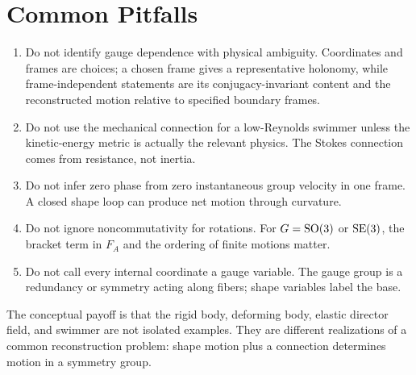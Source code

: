 \section{Common Pitfalls}
\label{sec:gauge-common-pitfalls}

\begin{enumerate}
\item Do not identify gauge dependence with physical ambiguity.  Coordinates
and frames are choices; a chosen frame gives a representative holonomy, while
frame-independent statements are its conjugacy-invariant content and the
reconstructed motion relative to specified boundary frames.
\item Do not use the mechanical connection for a low-Reynolds swimmer unless
the kinetic-energy metric is actually the relevant physics.  The Stokes
connection comes from resistance, not inertia.
\item Do not infer zero phase from zero instantaneous group velocity in one
frame.  A closed shape loop can produce net motion through curvature.
\item Do not ignore noncommutativity for rotations.  For \(G=\operatorname{SO}(3)\) or
\(\operatorname{SE}(3)\), the bracket term in \(F_A\) and the ordering of finite motions
matter.
\item Do not call every internal coordinate a gauge variable.  The gauge group
is a redundancy or symmetry acting along fibers; shape variables label the
base.
\end{enumerate}

The conceptual payoff is that the rigid body, deforming body, elastic director
field, and swimmer are not isolated examples.  They are different realizations
of a common reconstruction problem: shape motion plus a connection determines
motion in a symmetry group.
